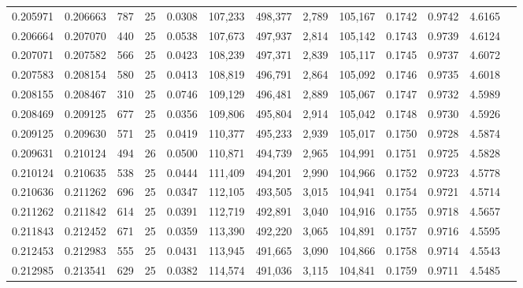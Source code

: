 \begin{tabular}{rrrrrrrrrrrrr}
0.205971 & 0.206663 &   787 &  25 &                                     0.0308 & 107,233 & 498,377 &   2,789 & 105,167 & 0.1742 & 0.9742 & 4.6165 \\
0.206664 & 0.207070 &   440 &  25 &                                     0.0538 & 107,673 & 497,937 &   2,814 & 105,142 & 0.1743 & 0.9739 & 4.6124 \\
0.207071 & 0.207582 &   566 &  25 &                                     0.0423 & 108,239 & 497,371 &   2,839 & 105,117 & 0.1745 & 0.9737 & 4.6072 \\
0.207583 & 0.208154 &   580 &  25 &                                     0.0413 & 108,819 & 496,791 &   2,864 & 105,092 & 0.1746 & 0.9735 & 4.6018 \\
0.208155 & 0.208467 &   310 &  25 &                                     0.0746 & 109,129 & 496,481 &   2,889 & 105,067 & 0.1747 & 0.9732 & 4.5989 \\
0.208469 & 0.209125 &   677 &  25 &                                     0.0356 & 109,806 & 495,804 &   2,914 & 105,042 & 0.1748 & 0.9730 & 4.5926 \\
0.209125 & 0.209630 &   571 &  25 &                                     0.0419 & 110,377 & 495,233 &   2,939 & 105,017 & 0.1750 & 0.9728 & 4.5874 \\
0.209631 & 0.210124 &   494 &  26 &                                     0.0500 & 110,871 & 494,739 &   2,965 & 104,991 & 0.1751 & 0.9725 & 4.5828 \\
0.210124 & 0.210635 &   538 &  25 &                                     0.0444 & 111,409 & 494,201 &   2,990 & 104,966 & 0.1752 & 0.9723 & 4.5778 \\
0.210636 & 0.211262 &   696 &  25 &                                     0.0347 & 112,105 & 493,505 &   3,015 & 104,941 & 0.1754 & 0.9721 & 4.5714 \\
0.211262 & 0.211842 &   614 &  25 &                                     0.0391 & 112,719 & 492,891 &   3,040 & 104,916 & 0.1755 & 0.9718 & 4.5657 \\
0.211843 & 0.212452 &   671 &  25 &                                     0.0359 & 113,390 & 492,220 &   3,065 & 104,891 & 0.1757 & 0.9716 & 4.5595 \\
0.212453 & 0.212983 &   555 &  25 &                                     0.0431 & 113,945 & 491,665 &   3,090 & 104,866 & 0.1758 & 0.9714 & 4.5543 \\
0.212985 & 0.213541 &   629 &  25 &                                     0.0382 & 114,574 & 491,036 &   3,115 & 104,841 & 0.1759 & 0.9711 & 4.5485 \\

\end{tabular}
